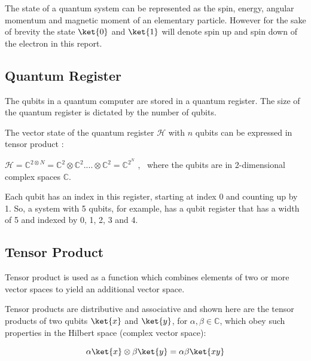 \documentclass{article}
\begin{document}
\noindent
The state of a quantum system can be represented as the spin, energy, angular momentum and magnetic moment of an elementary particle. However for the sake of brevity the state $\ket{0}$ and $\ket{1}$ will denote spin up and spin down of the electron in this report.
\vspace{10mm}

\subsection{Quantum Register}
\vspace{5mm}

\noindent
The qubits in a quantum computer are stored in a quantum register. The size of the quantum register is dictated by the number of qubits. 
\vspace{5mm}

\noindent
The vector state of the quantum register $\mathcal{H}$ with $n$ qubits can be expressed in tensor product \cite{noauthor_lecture_nodate}:
\vspace{5mm}


\qquad $\mathcal{H} = \mathbb{C}^{2\otimes N} = \mathbb{C}^2 \otimes\mathbb{C}^2 ....\otimes\mathbb{C}^2 = \mathbb{C}^{2^N} $ , \  where the qubits are in 2-dimensional complex spaces $\mathbb{C}$.
\vspace{5mm}

\noindent
Each qubit has an index in this register, starting at index 0 and counting up by 1. So, a system with 5 qubits, for example, has a qubit register that has a width of 5 and indexed by 0, 1, 2, 3 and 4.

\subsection{Tensor Product}
\vspace{5mm}

\noindent
Tensor product is used as a function which combines elements of two or more vector spaces to yield an additional vector space. 
\vspace{5mm}

\noindent
Tensor products are distributive and associative and shown here are the tensor products of two qubits $\ket{x}$ and $\ket{y}$, for $\alpha , \beta \in \mathbb{C}$, which obey such properties in the Hilbert space (complex vector space)\cite{noauthor_lecture_nodate}:
\vspace{5mm}


\begin{equation}
\alpha\ket{x} \otimes \beta\ket{y} = \alpha\beta\ket{xy}
\end{equation}
\vspace{5mm}
\end{document}
